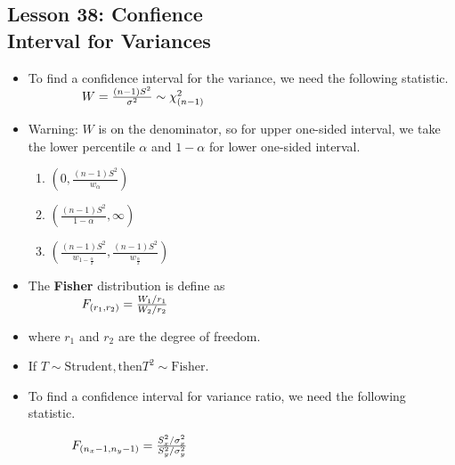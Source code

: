 \documentclass[10pt, french]{article}
\begin{document}
\begin{multicols*}{3}
\section*{Lesson 38: Confience \\ Interval for Variances}
\begin{itemize}[align=left,leftmargin=*]
  \item To find a confidence interval for the variance, we need the following statistic. \\
  $\hspace*{1.5cm} W = \frac{(n-1)S^2}{\sigma^2}\sim\chi_{(n-1)}^2$
  \item Warning: $W$ is on the denominator, so for upper one-sided interval, we take the lower percentile $\alpha$ and $1-\alpha$ for lower one-sided interval.
  \begin{enumerate}
      \item $\left(0, \frac{(n-1)S^2}{w_{\alpha}} \right)$
      \item $\left(\frac{(n-1)S^2}{1-\alpha}, \infty \right)$
      \item  $\left(\frac{(n-1)S^2}{w_{1-\frac{\alpha}{2}}}, \frac{(n-1)S^2}{w_{\frac{\alpha}{2}}} \right)$
  \end{enumerate}
  \item The \textbf{Fisher} distribution is define as \\
  $\hspace*{1.5cm} F_{(r_1,r_2)} = \frac{W_1/r_1}{W_2/r_2}$
  \item[] where $r_1$ and $r_2$ are the degree of freedom.
  \item If $T\sim \mathrm{Strudent}, \text{then} T^2\sim \mathrm{Fisher}$.
  \item
  \begin{flushleft}
    To find a confidence interval for variance ratio, we need the following statistic.
  \end{flushleft}
  $\hspace*{1.2cm} F_{(n_x - 1,n_y - 1)} = \frac{S_x^2/\sigma_x^2}{S_y^2/\sigma_y^2}$
\end{itemize}


\end{multicols*}
\end{document}
